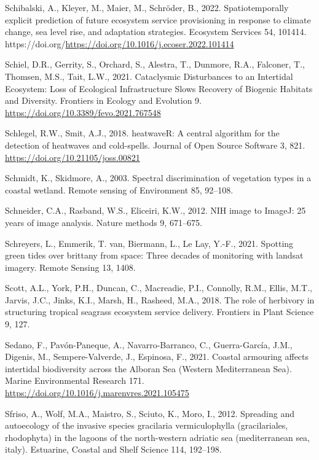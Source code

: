 \documentclass[
  letterpaper,
  11pt,
  english,
  singlespacing,
  headsepline]{MastersDoctoralThesis}
\newlength{\cslhangindent}
\newenvironment{CSLReferences}[2] %
 {\begin{list}{}{%
  \setlength{\itemindent}{0pt}
  \setlength{\leftmargin}{0pt}
  \setlength{\parsep}{0pt}
  \ifodd #1
   \setlength{\leftmargin}{\cslhangindent}
   \setlength{\itemindent}{-1\cslhangindent}
  \fi
  \setlength{\itemsep}{#2\baselineskip}}}
 {\end{list}}
\begin{document}
\begin{CSLReferences}{1}{0}
Schibalski, A., Kleyer, M., Maier, M., Schröder, B., 2022.
Spatiotemporally explicit prediction of future ecosystem service
provisioning in response to climate change, sea level rise, and
adaptation strategies. Ecosystem Services 54, 101414.
https://doi.org/\url{https://doi.org/10.1016/j.ecoser.2022.101414}

Schiel, D.R., Gerrity, S., Orchard, S., Alestra, T., Dunmore, R.A.,
Falconer, T., Thomsen, M.S., Tait, L.W., 2021. {Cataclysmic Disturbances
to an Intertidal Ecosystem: Loss of Ecological Infrastructure Slows
Recovery of Biogenic Habitats and Diversity}. Frontiers in Ecology and
Evolution 9. \url{https://doi.org/10.3389/fevo.2021.767548}

Schlegel, R.W., Smit, A.J., 2018. {heatwaveR}: A central algorithm for
the detection of heatwaves and cold-spells. Journal of Open Source
Software 3, 821. \url{https://doi.org/10.21105/joss.00821}

Schmidt, K., Skidmore, A., 2003. Spectral discrimination of vegetation
types in a coastal wetland. Remote sensing of Environment 85, 92--108.

Schneider, C.A., Rasband, W.S., Eliceiri, K.W., 2012. NIH image to
ImageJ: 25 years of image analysis. Nature methods 9, 671--675.

Schreyers, L., Emmerik, T. van, Biermann, L., Le Lay, Y.-F., 2021.
Spotting green tides over brittany from space: Three decades of
monitoring with landsat imagery. Remote Sensing 13, 1408.

Scott, A.L., York, P.H., Duncan, C., Macreadie, P.I., Connolly, R.M.,
Ellis, M.T., Jarvis, J.C., Jinks, K.I., Marsh, H., Rasheed, M.A., 2018.
The role of herbivory in structuring tropical seagrass ecosystem service
delivery. Frontiers in Plant Science 9, 127.

Sedano, F., Pavón-Paneque, A., Navarro-Barranco, C., Guerra-García,
J.M., Digenis, M., Sempere-Valverde, J., Espinosa, F., 2021. {Coastal
armouring affects intertidal biodiversity across the Alboran Sea
(Western Mediterranean Sea)}. Marine Environmental Research 171.
\url{https://doi.org/10.1016/j.marenvres.2021.105475}

Sfriso, A., Wolf, M.A., Maistro, S., Sciuto, K., Moro, I., 2012.
Spreading and autoecology of the invasive species gracilaria
vermiculophylla (gracilariales, rhodophyta) in the lagoons of the
north-western adriatic sea (mediterranean sea, italy). Estuarine,
Coastal and Shelf Science 114, 192--198.


\end{CSLReferences}
\end{document}
